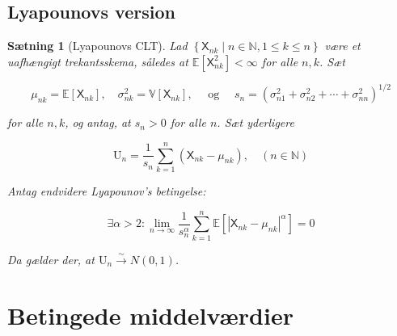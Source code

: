 \documentclass{article}
\newcommand{\1}{\mathbbm{1}}
\newcommand{\X}{\mathsf{X}}
\theoremstyle{boxed}
\newtheorem{proposition}[theorem]{Sætning}
\begin{document}
\subsection{Lyapounovs version}
\begin{theorem-box}
    \begin{proposition}[Lyapounovs CLT]
        Lad $\left\{\X_{n k} \mid n \in \mathbb{N}, 1 \leq k \leq n\right\}$ være et uafhængigt trekantsskema, således at $\mathbb{E}\left[\X_{n k}^2\right]<\infty$ for alle $n, k$. Sæt

$$
\mu_{n k}=\mathbb{E}\left[\X_{n k}\right], \quad \sigma_{n k}^2=\mathbb{V}\left[\X_{n k}\right], \quad \text { og } \quad s_n=\left(\sigma_{n 1}^2+\sigma_{n 2}^2+\cdots+\sigma_{n n}^2\right)^{1 / 2}
$$

for alle $n, k$, og antag, at $s_n>0$ for alle $n$.
Sæt yderligere

$$
\mathrm{U}_n=\frac{1}{s_n} \sum_{k=1}^n\left(\X_{n k}-\mu_{n k}\right), \quad(n \in \mathbb{N})
$$


Antag endvidere Lyapounov's betingelse:

$$
\exists \alpha>2: \lim _{n \rightarrow \infty} \frac{1}{s_n^\alpha} \sum_{k=1}^n \mathbb{E}\left[\left|\X_{n k}-\mu_{n k}\right|^\alpha\right]=0
$$


Da gælder der, at $\mathrm{U}_n \xrightarrow{\sim} N(0,1)$.
    \end{proposition}
\end{theorem-box}
\section{Betingede middelværdier}
\end{document}
